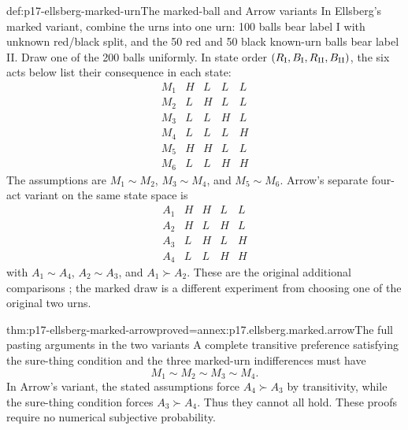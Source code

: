 \begin{hbdefinition}{def:p17-ellsberg-marked-urn}{The marked-ball and Arrow variants}
In Ellsberg's marked variant, combine the urns into one urn:
100 balls bear label I with unknown red/black split, and the
50 red and 50 black known-urn balls bear label II.
Draw one of the 200 balls uniformly.
In state order
\((R_{\rm I},B_{\rm I},R_{\rm II},B_{\rm II})\), the six
acts below list their consequence in each state:
\[
\begin{array}{c|cccc}
 M_1&H&L&L&L\\
 M_2&L&H&L&L\\
 M_3&L&L&H&L\\
 M_4&L&L&L&H\\
 M_5&H&H&L&L\\
 M_6&L&L&H&H
\end{array}
\]
The assumptions are \(M_1\sim M_2\), \(M_3\sim M_4\),
and \(M_5\sim M_6\).
Arrow's separate four-act variant on the same state space is
\[
\begin{array}{c|cccc}
 A_1&H&H&L&L\\
 A_2&H&L&H&L\\
 A_3&L&H&L&H\\
 A_4&L&L&H&H
\end{array}
\]
with \(A_1\sim A_4\), \(A_2\sim A_3\), and
\(A_1\succ A_2\).
These are the original additional comparisons
\cite[p.~652 and p.~654, footnote~4]{Ellsberg1961Ambiguity};
the marked draw is a different experiment from choosing one
of the original two urns.
\end{hbdefinition}

\begin{hbtheorem}{thm:p17-ellsberg-marked-arrow}{proved=annex:p17.ellsberg.marked.arrow}{The full pasting arguments in the two variants}
A complete transitive preference satisfying the sure-thing
condition and the three marked-urn indifferences must have
\[
                         M_1\sim M_2\sim M_3\sim M_4.
\]
In Arrow's variant, the stated assumptions force
\(A_4\succ A_3\) by transitivity, while the sure-thing
condition forces \(A_3\succ A_4\). Thus they cannot all hold.
These proofs require no numerical subjective probability.
\end{hbtheorem}


